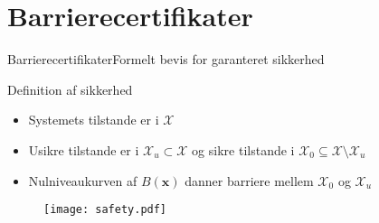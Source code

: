 
\section{Barrierecertifikater}
\begin{frame}{Barrierecertifikater}{Formelt bevis for garanteret sikkerhed}
\vspace{2mm}
\begin{block}{Definition af sikkerhed}
	\begin{itemize}
		\item Systemets tilstande er i $\mathcal{X}$
		\item Usikre tilstande er i $\mathcal{X}_u\subset\mathcal{X}$ og sikre tilstande i $\mathcal{X}_0\subseteq\mathcal{X}\setminus\mathcal{X}_u$
		\item Nulniveaukurven af $B(\textbf{x})$ danner  barriere mellem $\mathcal{X}_0$ og $\mathcal{X}_u$
	\end{itemize}
\end{block}
\begin{figure}[h]
	\centering
	\texttt{[image: safety.pdf]}
\end{figure}
\vspace{1cm}
\end{frame}

